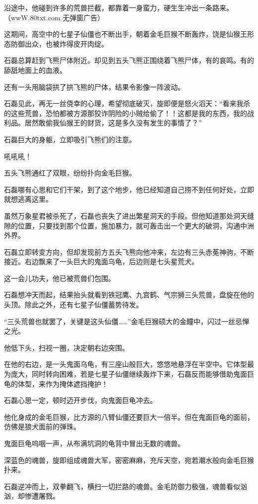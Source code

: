 \begin{this_body}
沿途中，他碰到许多的荒兽拦截，都靠着一身蛮力，硬生生冲出一条路来。（wwW.80txt.com 无弹窗广告）

这期间，高空中的七星子仙僵也不断出手，朝着金毛巨猴不断轰炸，饶是仙猴王形态防御出众，也被炸得皮开肉绽。

石磊总算赶到飞熊尸体附近。却见到五头飞熊正围绕着飞熊尸体，有的哀鸣。有的舔舐地面上的血液。

还有一头用脑袋拱了拱飞熊的尸体，结果令影像一阵波动。

石磊见此，再无一丝侥幸的心理，希望彻底破灭，旋即便是怒火滔天：“看来我杀的这些荒兽，恐怕都被方源那狡诈阴险的小贼给偷了！！这都是我的东西，我的战利品。居然敢偷我仙猴王的财货，这是多久没有发生的事情了？”

石磊巨大的身躯，立即吸引飞熊们的注意。

吼吼吼！

五头飞熊通红了双眼，纷纷扑向金毛巨猴。

石磊哪有心思和它们干架，到了这个地步，他已经知道自己捞不到任何好处，立即就想逃离这里。

虽然万象星君被杀死了，石磊也丧失了进出繁星洞天的手段。但他知道那处洞天缝隙的位置，只要找到那个位置，施加暴力，就可轰击出一个更大的破洞，沟通中洲外界。

石磊立即转变方向，但却发现前方五头飞熊向他冲来，左边有三头赤莬神驹，不断接近。右边飘来了一头巨大的鬼面乌龟，后边则是七头星荒犬。

这一会儿功夫，他已被荒兽们包围。

石磊想冲天而起，结果抬头就看到铁冠鹰、九宫鹤、气宗狮三头荒兽，盘旋在他的头顶。除此之外，还有七星子仙僵蓄势待发。

“三头荒兽也就罢了，关键是这头仙僵……”金毛巨猴硕大的金瞳中，闪过一丝忌惮之光。

他低下头，扫视一圈，决定朝右边突围。

在他的右边，是一头鬼面乌龟，有三座山般巨大，悠悠地悬浮在半空中。它体型最为庞大，同时转向困难，若是七星子仙僵继续轰炸下来，石磊反而能够借助鬼面巨龟的体型，来作为掩体遮挡掩护！

石磊心思一定，顿时迈开步伐，向鬼面巨龟冲去。

他化身成的金毛巨猴，比方源的八臂仙僵还要巨大一倍半。但在鬼面巨龟的面前，仿佛是狼犬面前的弹珠。

鬼面巨龟呜咽一声，从布满坑洞的龟背中冒出无数的魂兽。

深蓝色的魂兽，旋即组成魂兽大军，密密麻麻，充斥天空，宛若潮水般向金毛巨猴扑来。

石磊逆冲而上，双拳翻飞，横扫一切拦路的魂兽。金毛防御力极强，魂兽看似汹汹，却惨遭屠戮。


\end{this_body}
